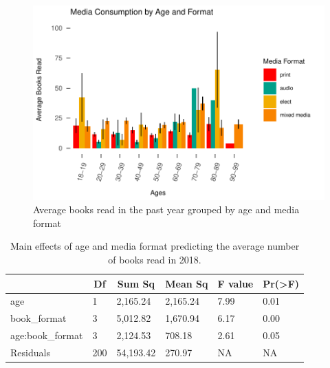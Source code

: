 \documentclass[man, fleqn, noextraspace]{apa6}
\theoremstyle{definition}
\theoremstyle{definition}
\theoremstyle{definition}
\theoremstyle{remark}
\begin{document}
\begin{figure}
\centering
\includegraphics{final_manuscript_files/figure-latex/fig3-1.pdf}
\caption{\label{fig:fig3}Average books read in the past year grouped by age
and media format}
\end{figure}

\begin{table}[tbp]
\begin{center}
\begin{threeparttable}
\caption{\label{tab:tab2}Main effects of age and media format predicting the average number of books read in 2018.}
\begin{tabular}{llllll}
\toprule
 & \multicolumn{1}{c}{Df} & \multicolumn{1}{c}{Sum Sq} & \multicolumn{1}{c}{Mean Sq} & \multicolumn{1}{c}{F value} & \multicolumn{1}{c}{Pr(>F)}\\
\midrule
age & 1 & 2,165.24 & 2,165.24 & 7.99 & 0.01\\
book\_format & 3 & 5,012.82 & 1,670.94 & 6.17 & 0.00\\
age:book\_format & 3 & 2,124.53 & 708.18 & 2.61 & 0.05\\
Residuals & 200 & 54,193.42 & 270.97 & NA & NA\\
\bottomrule
\end{tabular}
\end{threeparttable}
\end{center}
\end{table}
\end{document}
